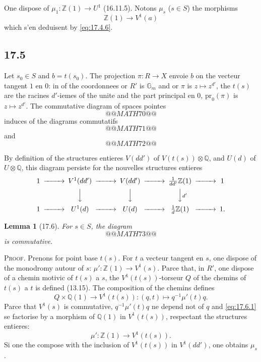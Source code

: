 \documentclass[12pt,a4paper]{article}
\theoremstyle{plain}
\newtheorem{lemma}[theorem]{Lemma}
\theoremstyle{definition}
\theoremstyle{remark}
\newcommand{\Gm}{\mathbb{G}_m}
\newcommand{\ZZ}{\mathbb{Z}}
\newcommand{\QQ}{\mathbb{Q}}
\begin{document}
One dispose of $\mu_1 : \ZZ(1) \to U^1$ (16.11.5). Notons $\mu_s$
($s \in S$) the morphisms
\begin{equation}\label{eq:17.4.8}
\ZZ(1) \to V^1(a)
\end{equation}
which s'en deduisent by \eqref{eq:17.4.6}.

\subsection{17.5}

Let $s_0 \in S$ and $b = t(s_0)$. The projection $\pi : R \to X$
envoie $b$ on the vecteur tangent $1$ en $0$: in of the coordonnees or
$R'$ is $\Gm$ and or $\pi$ is $z \mapsto z^{d'}$, the $t(s)$ are the
racines $d'$-iemes of the unite and the part principal en $0$,
$\mathrm{pr}_0(\pi)$ is $z \mapsto z^{d'}$. The commutative diagram
of spaces pointes
\[
@@MATH70@@
\]
induces of the diagrams commutatifs
\[
@@MATH71@@
\]
and
\[
@@MATH72@@
\]

By definition of the structures entieres $V(dd')$ of
$V(t(s)) \otimes \QQ$, and $U(d)$ of $U \otimes \QQ$, this diagram
persiste for the nouvelles structures entieres
\begin{equation}\label{eq:17.5.1}
\begin{CD}
1 @>>> V^1(dd') @>>> V(dd') @>>> \frac{1}{dd'}\ZZ(1) @>>> 1 \\
@. @VVV @VVV @VV{d'}V \\
1 @>>> U^1(d) @>>> U(d) @>>> \frac{1}{d}\ZZ(1) @>>> 1.
\end{CD}
\end{equation}

\begin{lemma}[17.6]\label{lem:17.6}
For $s \in S$, the diagram
\[
@@MATH73@@
\]
is commutative.
\end{lemma}

\noindent \textsc{Proof.} Prenons for point base $t(s)$. For $t$ a
vecteur tangent en $s$, one dispose of the monodromy autour of $s$:
$\mu' : \ZZ(1) \to V^1(s)$. Parce that, in $R'$, one dispose of a
chemin motivic of $t(s)$ a $s$, the $V^1(t(s))$-torseur $Q$ of the
chemins of $t(s)$ a $t$ is defined (13.15). The composition of the
chemins defines
\begin{equation}\label{eq:17.6.1}
Q \times \QQ(1) \to V^1(t(s)) : (q,t) \mapsto q^{-1}\mu'(t)q.
\end{equation}
Parce that $V^1(s)$ is commutative, $q^{-1}\mu'(t)q$ ne depend not of
$q$ and \eqref{eq:17.6.1} se factorise by a morphism of $\QQ(1)$
in $V^1(t(s))$, respectant the structures entieres:
\[
\mu' : \ZZ(1) \to V^1(t(s)).
\]
Si one the compose with the inclusion of $V^1(t(s))$ in $V^1(dd')$, one obtains $\mu_s$.
\end{document}

